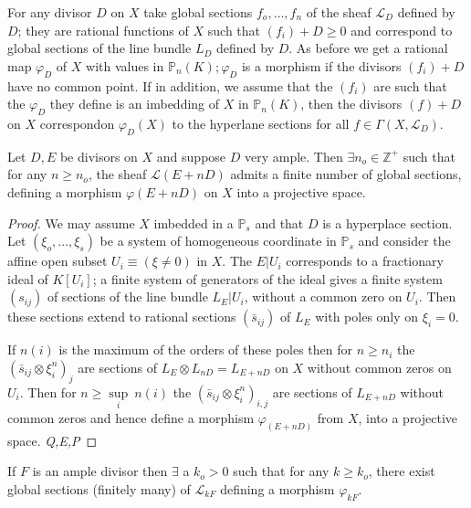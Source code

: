 {For any divisor $D$ on $X$ take global sections $f_{o},\ldots, f_{n}$
of the sheaf $\mathscr{L}_{D}$ defined by $D$; they are rational
functions of $X$ such that $(f_{i})+ D \ge 0$ and correspond to global
sections of the line bundle $L_{D}$ defined by $D$. As before we get a
rational map $\varphi_{D}$ of $X$ with values in $\mathbb{P}_{n}(K) ;
\varphi_{D}$ is a morphism if the divisors $(f_{i})+D$ have no common
point. If in 
addition, we assume that the $(f_{i})$ are such that the $\varphi_{D}$
they define is an imbedding of $X$ in $\mathbb{P}_{n}(K)$, then the
divisors $(f)+D$ on $X$ correspond\pageoriginale on $\varphi_{D}(X)$ to the
hyperlane sections for all $f \in \Gamma (X,\mathscr{L}_{D})$. 

\setcounter{proposition}{0}
\begin{proposition}\label{chap1:sec2:prop1}%
  Let $D,E$ be divisors on $X$ and suppose $D$ very ample. Then $\exists
  n_{o} \in \mathbb{Z}^{+}$ such that for any $n \ge n_{o}$, the sheaf
  $\mathscr{L}(E+n D)$ admits a finite number of global sections,
  defining a morphism $\varphi (E+n D)$  on $X$ into a projective
  space.  
\end{proposition} 
 
\begin{proof}%
  We may assume $X$ imbedded in a $\mathbb{P}_{s}$ and that $D$ is a
  hyperplace section. Let $(\xi_{o},\ldots ,\xi_{s})$ be a system of
  homogeneous coordinate in $\mathbb{P}_{s}$ and consider the affine
  open subset $U_{i} \equiv (\xi \neq 0)$ in $X$. The $E \big|{U_{i}}$
  corresponds to a fractionary ideal of $K[U_{i}]$; a finite system of
  generators of the ideal gives a finite system $(s_{ij})$ of sections
  of the line bundle $L_{E}\big| U_{i}$, without a common zero on
  $U_{i}$. Then these sections extend to rational sections
  $(\bar{s}_{ij})$ of $L_{E}$ with poles only on $\xi_{i} = 0$.  

  If  $n(i)$ is the maximum of the orders of these poles then for $n
  \ge n_{i}$ the $(\bar{s}_{ij} \otimes \xi^{n}_{i})_{j}$ are sections
  of $L_{E} \otimes L_{n D} = L_{E+nD}$ on $X$ without common zeros on
  $U_{i}$. Then for $n \ge \underset{i}\sup~ n(i)$ the
  $(\bar{s}_{ij}\otimes \xi^{n}_{i})_{i, j}$ are sections of
  $L_{E+nD}$ without common zeros and hence define a morphism
  $\varphi_{(E+nD)}$ from $X$, into a projective space. \hfill
  \textit{Q,E,P}   
\end{proof} 
 
\begin{proposition}\label{chap1:sec2:prop2}%
  If $F$ is an ample divisor then $\exists$ a $k_{o} > 0 $ such that
  for any $k \ge k_{o}$, there exist global sections (finitely many)
  of $\mathscr{L}_{kF}$ defining a morphism $\varphi_{kF}$. 
\end{proposition}

}
